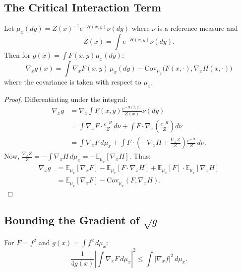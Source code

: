\subsection{The Critical Interaction Term}

\begin{theorem}\label{thm:gradient-conditional}
Let $\mu_x(dy) = Z(x)^{-1} e^{-H(x,y)} \nu(dy)$ where $\nu$ is a reference measure and 
\begin{equation}
    Z(x) = \int e^{-H(x,y)} \nu(dy).
\end{equation}
Then for $g(x) = \int F(x,y) \mu_x(dy)$:
\begin{equation}
    \nabla_x g(x) = \int \nabla_x F(x,y) \, \mu_x(dy) - \mathrm{Cov}_{\mu_x}\big(F(x,\cdot), \nabla_x H(x,\cdot)\big)
\end{equation}
where the covariance is taken with respect to $\mu_x$.
\end{theorem}

\begin{proof}
Differentiating under the integral:
\begin{align}
    \nabla_x g &= \nabla_x \int F(x,y) \frac{e^{-H(x,y)}}{Z(x)} \nu(dy) \\
    &= \int \nabla_x F \cdot \frac{e^{-H}}{Z} \, d\nu + \int F \cdot \nabla_x\left(\frac{e^{-H}}{Z}\right) d\nu \\
    &= \int \nabla_x F \, d\mu_x + \int F \cdot \left( -\nabla_x H + \frac{\nabla_x Z}{Z} \right) \frac{e^{-H}}{Z} \, d\nu.
\end{align}
Now, $\frac{\nabla_x Z}{Z} = -\int \nabla_x H \, d\mu_x = -\mathbb{E}_{\mu_x}[\nabla_x H]$. Thus:
\begin{align}
    \nabla_x g &= \mathbb{E}_{\mu_x}[\nabla_x F] - \mathbb{E}_{\mu_x}[F \cdot \nabla_x H] + \mathbb{E}_{\mu_x}[F] \cdot \mathbb{E}_{\mu_x}[\nabla_x H] \\
    &= \mathbb{E}_{\mu_x}[\nabla_x F] - \mathrm{Cov}_{\mu_x}(F, \nabla_x H).
\end{align}
\end{proof}

\subsection{Bounding the Gradient of \texorpdfstring{$\sqrt{g}$}{sqrt(g)}}

\begin{lemma}\label{lem:first-term}
For $F = f^2$ and $g(x) = \int f^2 \, d\mu_x$:
\begin{equation}
    \frac{1}{4g(x)} \left| \int \nabla_x F \, d\mu_x \right|^2 \leq \int |\nabla_x f|^2 \, d\mu_x.
\end{equation}
\end{lemma}

